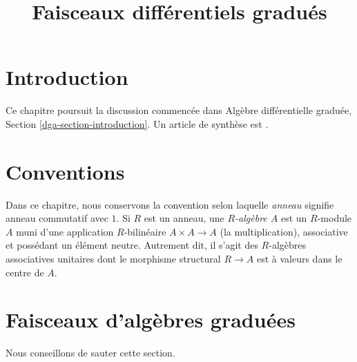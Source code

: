 

%


\title{Faisceaux différentiels gradués}


\maketitle

\label{section-phantom}

\tableofcontents

\section{Introduction}
\label{section-introduction}

\noindent
Ce chapitre poursuit la discussion commencée dans Algèbre différentielle
graduée, Section \ref{dga-section-introduction}. Un article de synthèse est
\cite{Keller-survey}.




\section{Conventions}
\label{section-conventions}

\noindent
Dans ce chapitre, nous conservons la convention selon laquelle {\it anneau}
signifie anneau commutatif avec $1$. Si $R$ est un anneau, une
{\it $R$-algèbre $A$} est un $R$-module $A$ muni d'une application
$R$-bilinéaire $A \times A \to A$ (la multiplication), associative et
possédant un élément neutre. Autrement dit, il s'agit des $R$-algèbres
associatives unitaires dont le morphisme structural $R \to A$ est à valeurs
dans le centre de $A$.








\section{Faisceaux d'algèbres graduées}
\label{section-ga}

\noindent
Nous conseillons de sauter cette section.

